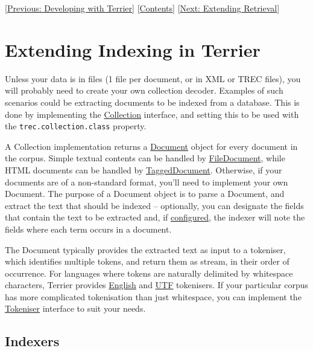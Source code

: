 {[}\href{terrier_develop.html}{Previous: Developing with Terrier}{]}
{[}\href{index.html}{Contents}{]} {[}\href{extend_retrieval.html}{Next:
Extending Retrieval}{]}\\

\section{Extending Indexing in
Terrier}\label{extending-indexing-in-terrier}

Unless your data is in files (1 file per document, or in XML or TREC
files), you will probably need to create your own collection decoder.
Examples of such scenarios could be extracting documents to be indexed
from a database. This is done by implementing the
\href{javadoc/org/terrier/indexing/Collection.html}{Collection}
interface, and setting this to be used with the
\texttt{trec.collection.class} property.

A Collection implementation returns a
\href{javadoc/org/terrier/indexing/Document.html}{Document} object for
every document in the corpus. Simple textual contents can be handled by
\href{javadoc/org/terrier/indexing/FileDocument.html}{FileDocument},
while HTML documents can be handled by
\href{javadoc/org/terrier/indexing/TaggedDocument.html}{TaggedDocument}.
Otherwise, if your documents are of a non-standard format, you'll need
to implement your own Document. The purpose of a Document object is to
parse a Document, and extract the text that should be indexed --
optionally, you can designate the fields that contain the text to be
extracted and, if \href{configure_indexing.html\#fields}{configured},
the indexer will note the fields where each term occurs in a document.

The Document typically provides the extracted text as input to a
tokeniser, which identifies multiple tokens, and return them as stream,
in their order of occurrence. For languages where tokens are naturally
delimited by whitespace characters, Terrier provides
\href{javadoc/org/terrier/indexing/tokenisation/EnglishTokeniser.html}{English}
and
\href{javadoc/org/terrier/indexing/tokenisation/UTFTokeniser.html}{UTF}
tokenisers. If your particular corpus has more complicated tokenisation
than just whitespace, you can implement the
\href{javadoc/org/terrier/indexing/tokenisation/Tokeniser.html}{Tokeniser}
interface to suit your needs.

\subsection{Indexers}\label{indexers}

